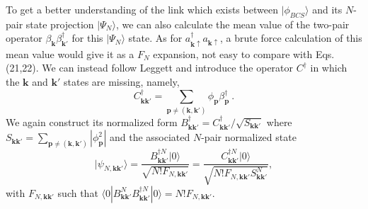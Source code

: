 \documentclass[twocolumn,showpacs]{revtex4}
\def\v#1{\mathbf{#1}}
\begin{document}
To get a better understanding of the link which exists between $|\phi_{BCS}\rangle$ and its $N$-pair state projection $|\Psi_N\rangle$, we can also calculate the mean value of the two-pair operator $\beta_{\v k}^{}\beta_{\v k'}^\dag$ for this $|\Psi_N\rangle$ state. As for $a_{\v k\uparrow}^\dag a_{\v k\uparrow}$, a brute force calculation of this mean value would give it as a $F_N$ expansion, not easy to compare with Eqs.(21,22). We can instead follow Leggett \cite{Leggett} and introduce the operator $C^\dag$ in which the $\v k$ and $\v k'$ states are missing, namely,
\begin{equation}
C_{\v k\v k'}^\dag=\sum_{\v p\neq (\v k,\v k')}\phi_{\v p}\beta_{\v p}^\dag\ .
\end{equation}
We again construct its normalized form $B_{\v k\v k'}^\dag=C_{\v k\v k'}^\dag/\sqrt{S_{\v k\v k'}}$ where $S_{\v k\v k'}=\sum_{\v p\neq (\v k,\v k')}|\phi_{\v p}^2|$ and the associated $N$-pair normalized state
\begin{equation}
|\psi_{N,\v k\v k'}\rangle=\frac{B_{\v k\v k'}^{\dag N}|0\rangle}{\sqrt{N!F_{N,\v k\v k'}}}=
\frac{C_{\v k\v k'}^{\dag N}|0\rangle}{\sqrt{N!F_{N,\v k\v k'}S_{\v k\v k'}^N}},
\end{equation}
with $F_{N,\v k\v k'}$ such that $\langle 0|B_{\v k\v k'}^NB_{\v k\v k'}^{\dag N}|0\rangle=N!F_{N,\v k\v k'}$.
\end{document}
